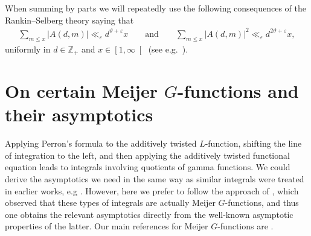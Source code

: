 \documentclass[a4paper,10pt,twoside]{amsart}
\theoremstyle{definition}
\numberwithin{equation}{section}
\newcommand\eps{\varepsilon}
\renewcommand\:{\colon}
\begin{document}
\noindent When summing by parts we will repeatedly use the following consequences of the Rankin--Selberg theory saying that
\begin{align}\label{Average-estimates}
\sum_{m\leqslant x}\left|A(d,m)\right|\ll_\eps d^{\vartheta+\varepsilon}x
\qquad\text{and}\qquad
\sum_{m\leqslant x}\left|A(d,m)\right|^2\ll_\eps d^{2\vartheta+\varepsilon}x,
\end{align}
uniformly in $d\in\mathbb Z_+$ and $x\in\left[1,\infty\right[$ (see e.g.\ \cite{Jaasaari--Vesalainen3}).

\section{On certain Meijer $G$-functions and their asymptotics}\label{meijer-section}

\noindent Applying Perron's formula to the additively twisted $L$-function, shifting the line of integration to the left, and then applying the additively twisted functional equation leads to integrals involving quotients of gamma functions. We could derive the asymptotics we need in the same way as similar integrals were treated in earlier works, e.g \cite{Ivic, Miller, Li, Ernvall-Hytonen--Jaasaari--Vesalainen, Jaasaari--Vesalainen1}. However, here we prefer to follow the approach of \cite{Czarnecki}, which observed that these types of integrals are actually Meijer $G$-functions, and thus one obtains the relevant asymptotics directly from the well-known asymptotic properties of the latter. Our main references for Meijer $G$-functions are \cite{Luke1, Luke2}.
\end{document}
